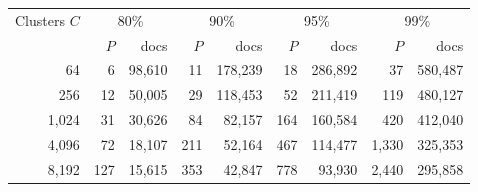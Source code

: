 \begin{tabular}{@{}rrrrrrrrr@{}}\toprule
Clusters $C$ & \multicolumn{2}{c}{80\%} & \multicolumn{2}{c}{90\%} & \multicolumn{2}{c}{95\%} & \multicolumn{2}{c}{99\%}\\
 & $P$ & docs & $P$ & docs & $P$ & docs & $P$ & docs\\\midrule
64 & 6 & 98,610 & 11 & 178,239 & 18 & 286,892 & 37 & 580,487\\
256 & 12 & 50,005 & 29 & 118,453 & 52 & 211,419 & 119 & 480,127\\
1,024 & 31 & 30,626 & 84 & 82,157 & 164 & 160,584 & 420 & 412,040\\
4,096 & 72 & 18,107 & 211 & 52,164 & 467 & 114,477 & 1,330 & 325,353\\
8,192 & 127 & 15,615 & 353 & 42,847 & 778 & 93,930 & 2,440 & 295,858\\
\bottomrule\end{tabular}
